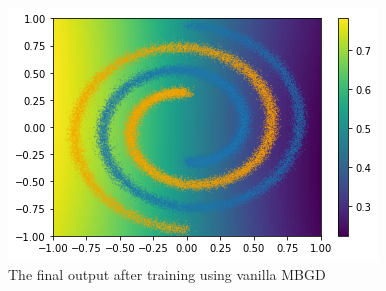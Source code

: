\documentclass[twocolumn]{article}
\begin{document}
\begin{figure}[ht!]
\begin{center}
  \centerline{\includegraphics[width=\columnwidth]{src/vanilla_sol.png}}
  \caption{The final output after training using vanilla MBGD}
  \label{van_sol}
\end{center}
\vskip -0.2in
\end{figure}



\end{document}
